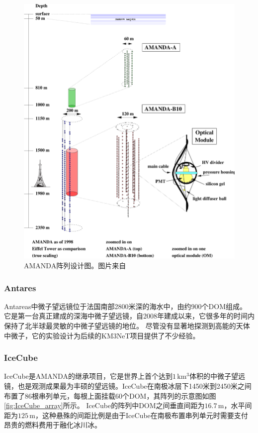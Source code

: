 \begin{figure}[htb]
    \centering
    \includegraphics[width=0.8\linewidth]{img/AMANDA.pdf}
    \caption{AMANDA阵列设计图。图片来自\cite{AMANDA:1999}}
    \label{fig:AMANDA}
\end{figure}

\subsubsection*{Antares}

Antareas中微子望远镜位于法国南部2800米深的海水中，由约900个DOM组成\cite{ANTARES:2011}。
它是第一台真正建成的深海中微子望远镜，自2008年建成以来，它很多年的时间内保持了北半球最灵敏的中微子望远镜的地位\cite{ANTARES_highlights:2022}。
尽管没有显著地探测到高能的天体中微子，它的实验设计为后续的KM3NeT项目提供了不少经验。

\subsubsection*{IceCube}

IceCube是AMANDA的继承项目，它是世界上首个达到$1\,\mathrm{km^3}$体积的中微子望远镜，也是观测成果最为丰硕的望远镜\cite{IceCube_detector:2016}。IceCube在南极冰层下1450米到2450米之间布置了86根串列单元，每根上面挂载60个DOM，其阵列的示意图如图\ref{fig:IceCube_array}所示。
IceCube的阵列中DOM之间垂直间距为$16.7\,\mathrm{m}$，水平间距为$125\,\mathrm{m}$，这种悬殊的间距比例是由于IceCube在南极布置串列单元时需要支付昂贵的燃料费用于融化冰川冰。


